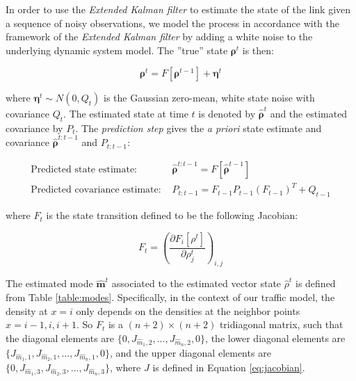 \documentclass[11pt]{article}
\numberwithin{equation}{section}
\numberwithin{figure}{section}
\numberwithin{table}{section}
\begin{document}
In order to use the \textit{Extended Kalman filter} to estimate the state of the link given a sequence of noisy observations, we model the process in accordance with the framework of the \textit{Extended Kalman filter} by adding a white noise to the underlying dynamic system model. The ''true'' state $\boldsymbol\rho^{t}$ is then:

\begin{equation}
\boldsymbol\rho^{t} = F[\boldsymbol\rho^{t-1}] + \boldsymbol\eta^{t}
\label{eq:underlyingSystem3}
\end{equation}

\noindent where $\boldsymbol\eta^{t}\sim N(0,Q_{t})$ is the Gaussian zero-mean, white state noise with covariance $Q_{t}$. The estimated state at time $t$ is denoted by $\hat{\boldsymbol\rho}^{t}$ and the estimated covariance by $P_{t}$. The \textit{prediction step} gives the \textit{a priori} state estimate and covariance $\hat{\boldsymbol\rho}^{t:t-1}$ and $P_{t:t-1}$:

\begin{equation}
\begin{array}{ll}
\text{Predicted state estimate: } & \hat{\boldsymbol\rho}^{t:t-1} = F[\hat{\boldsymbol\rho}^{t-1}]\\
\text{Predicted covariance estimate: } & P_{t:t-1} = F_{t-1}P_{t-1}(F_{t-1})^{T} + Q_{t-1}
\end{array}
\end{equation}

\noindent where $F_{t}$ is the state transition defined to be the following Jacobian:

\begin{equation}
F_{t} = \left(\frac{\partial F_{i}[\rho^{t}]}{\partial \rho^{t}_{j}}\right)_{i,j}
\label{eq:jacobian2}
\end{equation}

The estimated mode $\hat{\boldsymbol m}^{t}$ associated to the estimated vector state $\hat{\rho}^{t}$ is defined from Table \ref{table:modes}. Specifically, in the context of our traffic model, the density at $x=i$ only depends on the densities at the neighbor points $x=i-1,i,i+1$. So $F_{t}$ is a $(n+2)\times(n+2)$ tridiagonal matrix, such that the diagonal elements are $\{0, J_{\hat{m}_{1},2},...,J_{\hat{m}_{n},2},0\}$, the lower diagonal elements are $\{J_{\hat{m}_{1},1},J_{\hat{m}_{2},1},...,J_{\hat{m}_{n},1},0\}$, and the upper diagonal elements are $\{0,J_{\hat{m}_{1},3},J_{\hat{m}_{2},3},...,J_{\hat{m}_{n},3}\}$, where $J$ is defined in Equation \ref{eq:jacobian}. 
\end{document}
